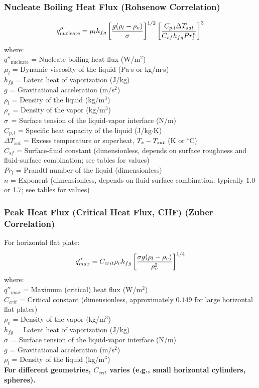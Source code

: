 \subsubsection*{Nucleate Boiling Heat Flux (Rohsenow Correlation)}
\begin{equation}
    q''_{\text{nucleate}} = \mu_l h_{fg} \left[ \frac{g(\rho_l - \rho_v)}{\sigma} \right]^{1/2} \left[ \frac{C_{p,l} \Delta T_{sat}}{C_{sf} h_{fg} Pr_l^n} \right]^3
\end{equation}
where: \\
$q''_{\text{nucleate}}$ = Nucleate boiling heat flux (W/m$^2$) \\
$\mu_l$ = Dynamic viscosity of the liquid (Pa$\cdot$s or kg/m$\cdot$s) \\
$h_{fg}$ = Latent heat of vaporization (J/kg) \\
$g$ = Gravitational acceleration (m/s$^2$) \\
$\rho_l$ = Density of the liquid (kg/m$^3$) \\
$\rho_v$ = Density of the vapor (kg/m$^3$) \\
$\sigma$ = Surface tension of the liquid-vapor interface (N/m) \\
$C_{p,l}$ = Specific heat capacity of the liquid (J/kg$\cdot$K) \\
$\Delta T_{sat}$ = Excess temperature or superheat, $T_s - T_{sat}$ (K or $^\circ$C) \\
$C_{sf}$ = Surface-fluid constant (dimensionless, depends on surface roughness and fluid-surface combination; see tables for values) \\
$Pr_l$ = Prandtl number of the liquid (dimensionless) \\
$n$ = Exponent (dimensionless, depends on fluid-surface combination; typically 1.0 or 1.7; see tables for values)

\subsubsection*{Peak Heat Flux (Critical Heat Flux, CHF) (Zuber Correlation)}
For horizontal flat plate:
\begin{equation}
    q''_{max} = C_{crit} \rho_v h_{fg} \left[ \frac{\sigma g (\rho_l - \rho_v)}{\rho_v^2} \right]^{1/4}
\end{equation}
where: \\
$q''_{max}$ = Maximum (critical) heat flux (W/m$^2$) \\
$C_{crit}$ = Critical constant (dimensionless, approximately $0.149$ for large horizontal flat plates) \\
$\rho_v$ = Density of the vapor (kg/m$^3$) \\
$h_{fg}$ = Latent heat of vaporization (J/kg) \\
$\sigma$ = Surface tension of the liquid-vapor interface (N/m) \\
$g$ = Gravitational acceleration (m/s$^2$) \\
$\rho_l$ = Density of the liquid (kg/m$^3$) \\
\quad \textbf{For different geometries, $C_{crit}$ varies (e.g., small horizontal cylinders, spheres).}

